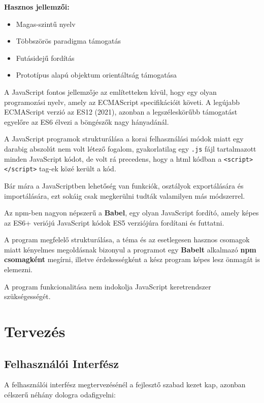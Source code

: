 \textbf{Hasznos jellemzői:}
\begin{itemize}
	\item Magas-szintű nyelv
	\item Többszörös paradigma támogatás
	\item Futásidejű fordítás
	\item Prototípus alapú objektum orientáltság támogatása
\end{itemize}
\begin{flushright}
	\cite{javascript}
\end{flushright}

A JavaScript fontos jellemzője az említetteken kívül, hogy egy olyan programozási nyelv, amely az ECMAScript specifikációit követi. A legújabb ECMAScript verzió az ES12 (2021), azonban a legszéleskörűbb támogatást egyelőre az ES6 élvezi a böngészők nagy hányadánál. 

A JavaScript programok strukturálása a korai felhasználási módok miatt egy darabig abszolút nem volt létező fogalom, gyakorlatilag egy \texttt{.js} fájl tartalmazott minden JavaScript kódot, de volt rá precedens, hogy a html kódban a \texttt{<script></script>} tag-ek közé került a kód.

Bár mára a JavaScriptben lehetőség van funkciók, osztályok exportálására és importálására, ezt sokáig csak megkerülni tudták valamilyen más módszerrel.

Az npm-ben nagyon népszerű a \textbf{Babel}, egy olyan JavaScript fordító, amely képes az ES6+ veriójú JavaScript kódok ES5 verziójúra fordítani és futtatni.

A program megfelelő strukturálása, a téma és az esetlegesen hasznos csomagok miatt kényelmes megoldásnak bizonyul a programot egy \textbf{Babelt} alkalmazó \textbf{npm csomagként} megírni, illetve érdekességként a kész program képes lesz önmagát is elemezni.

A program funkcionalitása nem indokolja JavaScript keretrendszer szükségességét.

\pagebreak

\section{Tervezés}

\subsection{Felhasználói Interfész}

A felhasználói interfész megtervezésénél a fejlesztő szabad kezet kap, azonban célszerű néhány dologra odafigyelni:

